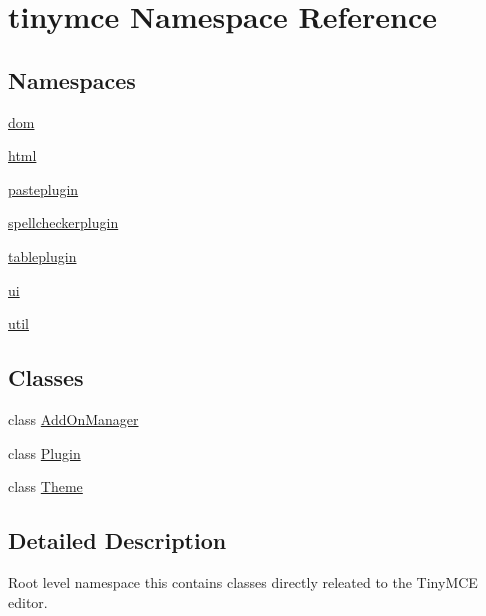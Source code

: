 \hypertarget{namespacetinymce}{\section{tinymce Namespace Reference}
\label{namespacetinymce}
}
\subsection*{Namespaces}
\begin{DoxyCompactItemize}
\item 
 \hyperlink{namespacetinymce_1_1dom}{dom}
\item 
 \hyperlink{namespacetinymce_1_1html}{html}
\item 
 \hyperlink{namespacetinymce_1_1pasteplugin}{pasteplugin}
\item 
 \hyperlink{namespacetinymce_1_1spellcheckerplugin}{spellcheckerplugin}
\item 
 \hyperlink{namespacetinymce_1_1tableplugin}{tableplugin}
\item 
 \hyperlink{namespacetinymce_1_1ui}{ui}
\item 
 \hyperlink{namespacetinymce_1_1util}{util}
\end{DoxyCompactItemize}
\subsection*{Classes}
\begin{DoxyCompactItemize}
\item 
class \hyperlink{classtinymce_1_1_add_on_manager}{Add\+On\+Manager}
\item 
class \hyperlink{classtinymce_1_1_plugin}{Plugin}
\item 
class \hyperlink{classtinymce_1_1_theme}{Theme}
\end{DoxyCompactItemize}


\subsection{Detailed Description}
Root level namespace this contains classes directly releated to the Tiny\+M\+C\+E editor. 